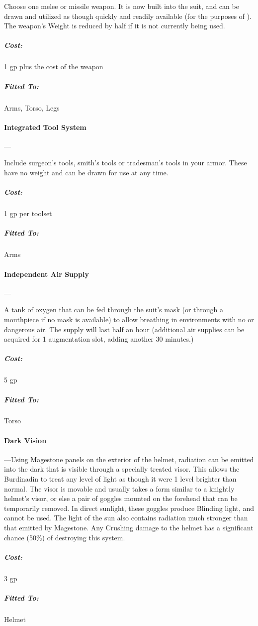 \documentclass[oneside,11pt,english]{book}
\begin{document}
Choose one melee or missile weapon. It is now built into the suit, and can be drawn and utilized as though 
quickly and readily available (for the purposes of ). The weapon’s Weight is reduced by half if it is not currently being used.
\vspace{-15pt}\subparagraph{Cost:} 1 gp plus the cost of the weapon
\vspace{-15pt}\subparagraph{Fitted To:} Arms, Torso, Legs

\paragraph{Integrated Tool System}---

Include surgeon’s tools, smith’s tools or tradesman’s tools in your armor. These have no weight and can 
be drawn for use at any time.
\vspace{-15pt}\subparagraph{Cost:} 1 gp per toolset
\vspace{-15pt}\subparagraph{Fitted To:} Arms

\paragraph{Independent Air Supply}---\quad[2/1]

A tank of oxygen that can be fed through the suit’s mask (or through a mouthpiece if no mask is available) to allow breathing in environments with no or dangerous air. The supply will last half an hour (additional air supplies can be acquired for 1 augmentation slot, adding another 30 minutes.)
\vspace{-15pt}\subparagraph{Cost:} 5 gp
\vspace{-15pt}\subparagraph{Fitted To:} Torso

\paragraph{Dark Vision}---\quad[2]
Using Magestone panels on the exterior of the helmet, radiation can be emitted into the dark that is visible 
through a specially treated visor. This allows the Burdinadin to treat any level of light as though it were 1 
level brighter than normal. The visor is movable and usually takes a form similar to a knightly helmet’s 
visor, or else a pair of goggles mounted on the forehead that can be temporarily removed. In direct 
sunlight, these goggles produce Blinding light, and cannot be used. The light of the sun also contains 
radiation much stronger than that emitted by Magestone. Any Crushing damage to the helmet has a 
significant chance (50\%) of destroying this system.
\vspace{-15pt}\subparagraph{Cost:} 3 gp
\vspace{-15pt}\subparagraph{Fitted To:} Helmet
\end{document}

